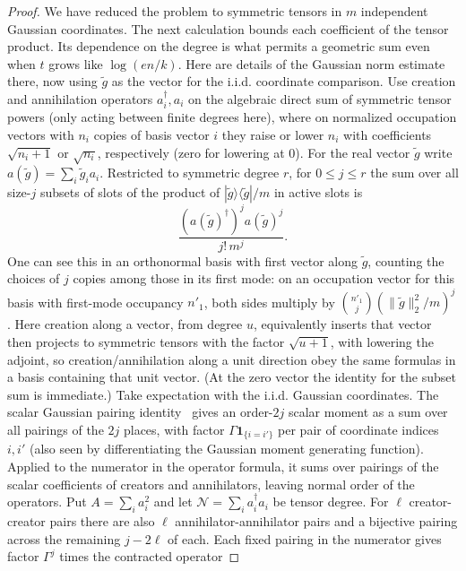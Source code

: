 \begin{proof}
We have reduced the problem to symmetric tensors in $m$ independent
Gaussian coordinates.  The next calculation bounds each coefficient of
the tensor product.  Its dependence on the degree is what permits a
geometric sum even when $t$ grows like $\log(en/k)$.
Here are details of the Gaussian norm estimate there, now using \(\widetilde g\) as the vector for the i.i.d. coordinate comparison. Use creation and annihilation operators \(a_i^\dagger,a_i\) on the algebraic direct sum of symmetric tensor powers (only acting between finite degrees here), where on normalized occupation vectors with \(n_i\) copies of basis vector \(i\) they raise or lower \(n_i\) with coefficients \(\sqrt{n_i+1}\) or \(\sqrt{n_i}\), respectively (zero for lowering at 0). For the real vector \(\widetilde g\) write \(a(\widetilde g)=\sum_i \widetilde g_i a_i\). Restricted to symmetric degree \(r\), for \(0\le j\le r\) the sum over all size-\(j\) subsets of slots of the product of \(|\widetilde g\rangle\langle\widetilde g|/m\) in active slots is
\[
\frac{(a(\widetilde g)^\dagger)^j a(\widetilde g)^j}{j!\,m^j}.
\]
One can see this in an orthonormal basis with first vector along \(\widetilde g\), counting the choices of \(j\) copies among those in its first mode: on an occupation vector for this basis with first-mode occupancy \(n'_1\), both sides multiply by \(\binom{n'_1}{j}(\|\widetilde g\|_2^2/m)^j\). Here creation along a vector, from degree \(u\), equivalently inserts that vector then projects to symmetric tensors with the factor \(\sqrt{u+1}\), with lowering the adjoint, so creation/annihilation along a unit direction obey the same formulas in a basis containing that unit vector. (At the zero vector the identity for the subset sum is immediate.) Take expectation with the i.i.d. Gaussian coordinates. The scalar Gaussian pairing identity~\cite{Isserlis1918} gives an order-\(2j\) scalar moment as a sum over all pairings of the \(2j\) places, with factor \(\Gamma\mathbf1_{\{i=i'\}}\) per pair of coordinate indices \(i,i'\) (also seen by differentiating the Gaussian moment generating function). Applied to the numerator in the operator formula, it sums over pairings of the scalar coefficients of creators and annihilators, leaving normal order of the operators. Put \(A=\sum_i a_i^2\) and let \(\mathcal N=\sum_i a_i^\dagger a_i\) be tensor degree. For \(\ell\) creator-creator pairs there are also \(\ell\) annihilator-annihilator pairs and a bijective pairing across the remaining \(j-2\ell\) of each. Each fixed pairing in the numerator gives factor \(\Gamma^j\) times the contracted operator

\end{proof}
